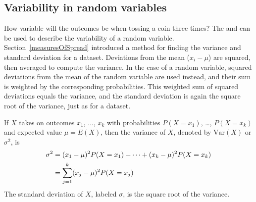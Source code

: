 


\subsection{Variability in random variables}

How variable will the outcomes be when tossing a coin three times?  The  and  can be used to describe the variability of a random variable. Section~\ref{measuresOfSpread} introduced a method for finding the variance and standard deviation for a dataset.  Deviations from the mean ($x_i - \mu$) are squared, then averaged to compute the variance. In the case of a random variable, squared deviations from the mean of the random variable are used instead, and their sum is weighted by the corresponding probabilities. This weighted sum of squared deviations equals the variance, and the standard deviation is again the square root of the variance, just as for a dataset.

\begin{termBox}{
If $X$ takes on outcomes $x_1$, ..., $x_k$ with probabilities $P(X=x_1)$, \dots, $P(X=x_k)$ and expected value $\mu=E(X)$, then the variance of $X$, denoted by $\text{Var}(X)$ or $\sigma^2$, is
\begin{align}
\sigma^2 &= (x_1-\mu)^2 P(X=x_1) + \cdots \notag + (x_k-\mu)^2 P(X=x_k) \notag \\
	&= \sum_{j=1}^{k} (x_j - \mu)^2 P(X=x_j)
\end{align}
The standard deviation of $X$, labeled $\sigma$, is the square root of the variance.}
\end{termBox}

